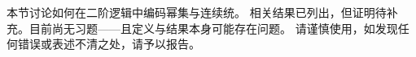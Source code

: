 \documentclass[../../../include/open-logic-chapter]{subfiles}
\begin{document}

\begin{editorial}
本节讨论如何在二阶逻辑中编码幂集与连续统。
相关结果已列出，但证明待补充。目前尚无习题——且定义与结果本身可能存在问题。
请谨慎使用，如发现任何错误或表述不清之处，请予以报告。
\end{editorial}





\OLEndChapterHook
\end{document}
